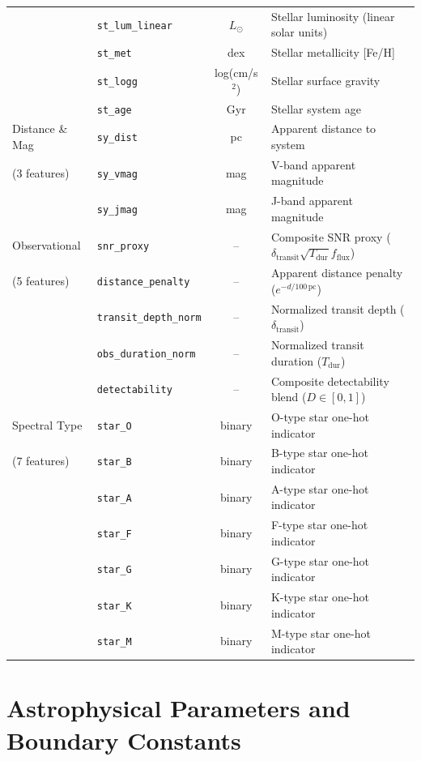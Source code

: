 \documentclass[11pt,a4paper]{article}
\begin{document}
\begin{longtable}{llcp{7.5cm}}
& \texttt{st\_lum\_linear} & $L_\odot$ & Stellar luminosity (linear solar units) \\
& \texttt{st\_met} & dex & Stellar metallicity [Fe/H] \\
& \texttt{st\_logg} & log(cm/s$^2$) & Stellar surface gravity \\
& \texttt{st\_age} & Gyr & Stellar system age \\
\midrule
Distance \& Mag & \texttt{sy\_dist} & pc & Apparent distance to system \\
(3 features) & \texttt{sy\_vmag} & mag & V-band apparent magnitude \\
& \texttt{sy\_jmag} & mag & J-band apparent magnitude \\
\midrule
Observational & \texttt{snr\_proxy} & -- & Composite SNR proxy ($\delta_{\text{transit}} \sqrt{T_{\text{dur}}} f_{\text{flux}}$) \\
(5 features) & \texttt{distance\_penalty} & -- & Apparent distance penalty ($e^{-d / 100\,\text{pc}}$) \\
& \texttt{transit\_depth\_norm} & -- & Normalized transit depth ($\delta_{\text{transit}}$) \\
& \texttt{obs\_duration\_norm} & -- & Normalized transit duration ($T_{\text{dur}}$) \\
& \texttt{detectability} & -- & Composite detectability blend ($D \in [0,1]$) \\
\midrule
Spectral Type & \texttt{star\_O} & binary & O-type star one-hot indicator \\
(7 features) & \texttt{star\_B} & binary & B-type star one-hot indicator \\
& \texttt{star\_A} & binary & A-type star one-hot indicator \\
& \texttt{star\_F} & binary & F-type star one-hot indicator \\
& \texttt{star\_G} & binary & G-type star one-hot indicator \\
& \texttt{star\_K} & binary & K-type star one-hot indicator \\
& \texttt{star\_M} & binary & M-type star one-hot indicator \\
\end{longtable}

\newpage

\section{Astrophysical Parameters and Boundary Constants}
\label{app:constants}
\end{document}
